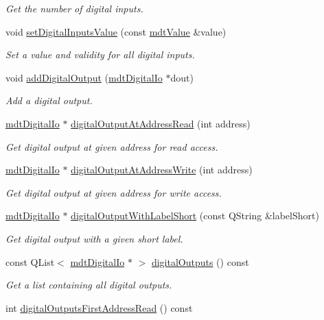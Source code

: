 \begin{DoxyCompactItemize}
\begin{DoxyCompactList}\small\item\em Get the number of digital inputs. \end{DoxyCompactList}\item 
\hypertarget{classmdt_device_ios_a136d4a817fbd14c375ff068c436f3eeb}{
void \hyperlink{classmdt_device_ios_a136d4a817fbd14c375ff068c436f3eeb}{setDigitalInputsValue} (const \hyperlink{classmdt_value}{mdtValue} \&value)}
\label{classmdt_device_ios_a136d4a817fbd14c375ff068c436f3eeb}

\begin{DoxyCompactList}\small\item\em Set a value and validity for all digital inputs. \end{DoxyCompactList}\item 
void \hyperlink{classmdt_device_ios_af1f41d3c60f1030fb303436820417d14}{addDigitalOutput} (\hyperlink{classmdt_digital_io}{mdtDigitalIo} $\ast$dout)
\begin{DoxyCompactList}\small\item\em Add a digital output. \end{DoxyCompactList}\item 
\hyperlink{classmdt_digital_io}{mdtDigitalIo} $\ast$ \hyperlink{classmdt_device_ios_a87647e98e2574a1e5f7c8780f9c33b13}{digitalOutputAtAddressRead} (int address)
\begin{DoxyCompactList}\small\item\em Get digital output at given address for read access. \end{DoxyCompactList}\item 
\hyperlink{classmdt_digital_io}{mdtDigitalIo} $\ast$ \hyperlink{classmdt_device_ios_af50bc664e381265b93b1e8faf7f883b7}{digitalOutputAtAddressWrite} (int address)
\begin{DoxyCompactList}\small\item\em Get digital output at given address for write access. \end{DoxyCompactList}\item 
\hyperlink{classmdt_digital_io}{mdtDigitalIo} $\ast$ \hyperlink{classmdt_device_ios_acecc7f9abb21613fed90212eef4d4dda}{digitalOutputWithLabelShort} (const QString \&labelShort)
\begin{DoxyCompactList}\small\item\em Get digital output with a given short label. \end{DoxyCompactList}\item 
const QList$<$ \hyperlink{classmdt_digital_io}{mdtDigitalIo} $\ast$ $>$ \hyperlink{classmdt_device_ios_a74418e6be28a2017140f102484f0df31}{digitalOutputs} () const 
\begin{DoxyCompactList}\small\item\em Get a list containing all digital outputs. \end{DoxyCompactList}\item 
\hypertarget{classmdt_device_ios_af5683713bafa419f199ac756b769c9b7}{
int \hyperlink{classmdt_device_ios_af5683713bafa419f199ac756b769c9b7}{digitalOutputsFirstAddressRead} () const }
\label{classmdt_device_ios_af5683713bafa419f199ac756b769c9b7}


\end{DoxyCompactItemize}
